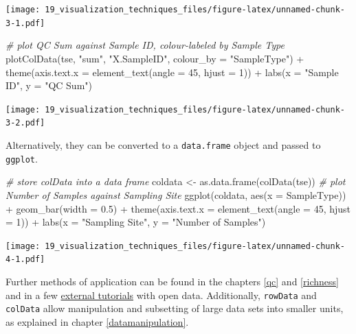 \documentclass[
]{book}
\newenvironment{Shaded}{\begin{snugshade}}{\end{snugshade}}
\newcommand{\AttributeTok}[1]{\textcolor[rgb]{0.77,0.63,0.00}{#1}}
\newcommand{\CommentTok}[1]{\textcolor[rgb]{0.56,0.35,0.01}{\textit{#1}}}
\newcommand{\DecValTok}[1]{\textcolor[rgb]{0.00,0.00,0.81}{#1}}
\newcommand{\FloatTok}[1]{\textcolor[rgb]{0.00,0.00,0.81}{#1}}
\newcommand{\FunctionTok}[1]{\textcolor[rgb]{0.00,0.00,0.00}{#1}}
\newcommand{\NormalTok}[1]{#1}
\newcommand{\OtherTok}[1]{\textcolor[rgb]{0.56,0.35,0.01}{#1}}
\newcommand{\SpecialCharTok}[1]{\textcolor[rgb]{0.00,0.00,0.00}{#1}}
\newcommand{\StringTok}[1]{\textcolor[rgb]{0.31,0.60,0.02}{#1}}
\begin{document}
\texttt{[image: 19\_visualization\_techniques\_files/figure-latex/unnamed-chunk-3-1.pdf]}

\begin{Shaded}
\begin{Highlighting}[]
\CommentTok{\# plot QC Sum against Sample ID, colour{-}labeled by Sample Type}
\FunctionTok{plotColData}\NormalTok{(tse, }\StringTok{"sum"}\NormalTok{, }\StringTok{"X.SampleID"}\NormalTok{, }\AttributeTok{colour\_by =} \StringTok{"SampleType"}\NormalTok{) }\SpecialCharTok{+}
  \FunctionTok{theme}\NormalTok{(}\AttributeTok{axis.text.x =} \FunctionTok{element\_text}\NormalTok{(}\AttributeTok{angle =} \DecValTok{45}\NormalTok{, }\AttributeTok{hjust =} \DecValTok{1}\NormalTok{)) }\SpecialCharTok{+}
  \FunctionTok{labs}\NormalTok{(}\AttributeTok{x =} \StringTok{"Sample ID"}\NormalTok{, }\AttributeTok{y =} \StringTok{"QC Sum"}\NormalTok{)}
\end{Highlighting}
\end{Shaded}

\texttt{[image: 19\_visualization\_techniques\_files/figure-latex/unnamed-chunk-3-2.pdf]}

Alternatively, they can be converted to a \texttt{data.frame} object and passed to \texttt{ggplot}.

\begin{Shaded}
\begin{Highlighting}[]
\CommentTok{\# store colData into a data frame}
\NormalTok{coldata }\OtherTok{\textless{}{-}} \FunctionTok{as.data.frame}\NormalTok{(}\FunctionTok{colData}\NormalTok{(tse))}
\CommentTok{\# plot Number of Samples against Sampling Site}
\FunctionTok{ggplot}\NormalTok{(coldata, }\FunctionTok{aes}\NormalTok{(}\AttributeTok{x =}\NormalTok{ SampleType)) }\SpecialCharTok{+}
  \FunctionTok{geom\_bar}\NormalTok{(}\AttributeTok{width =} \FloatTok{0.5}\NormalTok{) }\SpecialCharTok{+}
  \FunctionTok{theme}\NormalTok{(}\AttributeTok{axis.text.x =} \FunctionTok{element\_text}\NormalTok{(}\AttributeTok{angle =} \DecValTok{45}\NormalTok{, }\AttributeTok{hjust =} \DecValTok{1}\NormalTok{)) }\SpecialCharTok{+}
  \FunctionTok{labs}\NormalTok{(}\AttributeTok{x =} \StringTok{"Sampling Site"}\NormalTok{,}
       \AttributeTok{y =} \StringTok{"Number of Samples"}\NormalTok{)}
\end{Highlighting}
\end{Shaded}

\texttt{[image: 19\_visualization\_techniques\_files/figure-latex/unnamed-chunk-4-1.pdf]}

Further methods of application can be found in the chapters \ref{qc} and
\ref{richness} and in a few \href{https://github.com/davismcc/scater_tutorials_open_data}{external tutorials}
with open data. Additionally, \texttt{rowData} and \texttt{colData} allow manipulation and
subsetting of large data sets into smaller units, as explained in chapter \ref{datamanipulation}.
\end{document}
